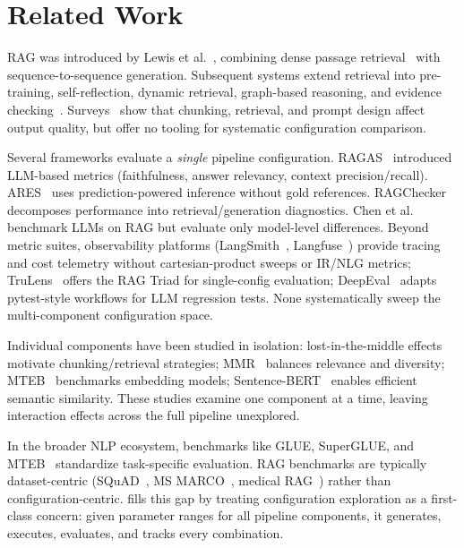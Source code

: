 \section{Related Work}
\label{sec:related}

RAG was introduced by Lewis et al.~\cite{lewis2020retrieval}, combining dense passage retrieval~\cite{karpukhin2020dense} with sequence-to-sequence generation. Subsequent systems extend retrieval into pre-training, self-reflection, dynamic retrieval, graph-based reasoning, and evidence checking~\cite{guu2020realm,asai2024selfrag,jiang2024active,edge2024local,li2024chain}. Surveys~\cite{gao2024retrieval,zhao2024retrieval} show that chunking, retrieval, and prompt design affect output quality, but offer no tooling for systematic configuration comparison.

Several frameworks evaluate a \emph{single} pipeline configuration. RAGAS~\cite{es2023ragas} introduced LLM-based metrics (faithfulness, answer relevancy, context precision/recall). ARES~\cite{saadfalcon2024ares} uses prediction-powered inference without gold references. RAGChecker~\cite{ragchecker2024} decomposes performance into retrieval/generation diagnostics. Chen et al.~\cite{chen2024benchmarking} benchmark LLMs on RAG but evaluate only model-level differences. Beyond metric suites, observability platforms (LangSmith~\cite{langsmith2024}, Langfuse~\cite{langfuse2024}) provide tracing and cost telemetry without cartesian-product sweeps or IR/NLG metrics; TruLens~\cite{trulens2023} offers the RAG Triad for single-config evaluation; DeepEval~\cite{deepeval2024} adapts pytest-style workflows for LLM regression tests. None systematically sweep the multi-component configuration space.

Individual components have been studied in isolation: lost-in-the-middle effects~\cite{liu2024lost} motivate chunking/retrieval strategies; MMR~\cite{carbonell1998mmr} balances relevance and diversity; MTEB~\cite{muennighoff2022mteb} benchmarks embedding models; Sentence-BERT~\cite{reimers2019sentence} enables efficient semantic similarity. These studies examine one component at a time, leaving interaction effects across the full pipeline unexplored.

In the broader NLP ecosystem, benchmarks like GLUE, SuperGLUE, and MTEB~\cite{muennighoff2022mteb} standardize task-specific evaluation. RAG benchmarks are typically dataset-centric (SQuAD~\cite{rajpurkar2016squad}, MS MARCO~\cite{wu2024msmarco}, medical RAG~\cite{song2024bench}) rather than configuration-centric. \toolname{} fills this gap by treating configuration exploration as a first-class concern: given parameter ranges for all pipeline components, it generates, executes, evaluates, and tracks every combination.
